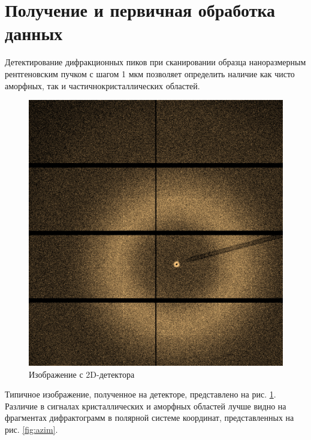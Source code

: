 	\section{Получение и первичная обработка данных}
	
	Детектирование дифракционных пиков при сканировании образца наноразмерным рентгеновским пучком с шагом 1 мкм позволяет определить наличие как чисто аморфных, так и частичнокристаллических областей.
		\begin{figure}
\vspace{-15px}
  \begin{center}
    \includegraphics[width=0.95\linewidth]{fig/obj.png}
    \vspace{3px}
    \caption{Изображение с 2D-детектора}
    \label{fig:difractogram}
  \end{center}
\end{figure}
	
	 
	Типичное изображение, полученное на детекторе, представлено на рис. \ref{fig:difractogram}. Различие в сигналах кристаллических и аморфных областей лучше видно на фрагментах дифрактограмм в полярной системе координат, представленных на рис. \ref{fig:azim}.
	
